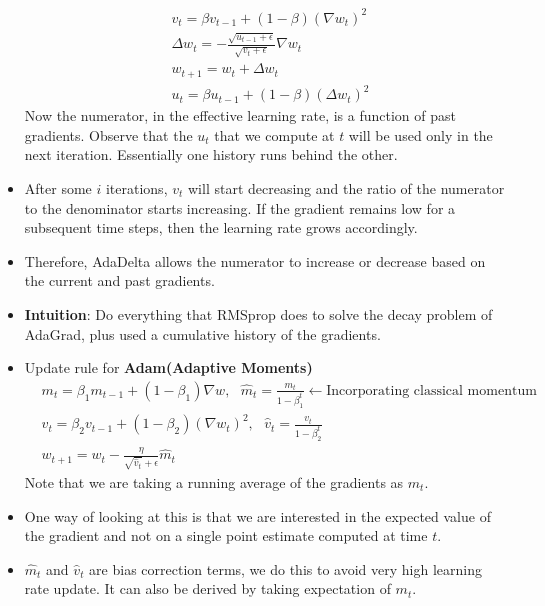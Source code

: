 \documentclass[a4paper]{article}
\begin{document}
\begin{itemize}
\begin{equation*}
        \begin{split}
            &v_t = \beta v_{t-1} + (1-\beta)(\nabla w_t)^2\\
            &\Delta w_t = -\frac{\sqrt{u_{t-1}+\epsilon}}{\sqrt{v_t+\epsilon}}\nabla w_t\\
            &w_{t+1} = w_t+\Delta w_t\\
            &u_t = \beta u_{t-1}+(1-\beta)(\Delta w_t)^2
        \end{split}
    \end{equation*}
    Now the numerator, in the effective learning rate, is a function of past gradients. Observe that the $u_t$ that we compute at $t$ will be used only in the next iteration. Essentially one history runs behind the other.
    \item After some $i$ iterations, $v_t$ will start decreasing and the ratio of the numerator to the denominator starts increasing. If the gradient remains low for a subsequent time steps, then the learning rate grows accordingly.
    \item Therefore, AdaDelta allows the numerator to increase or decrease based on the current and past gradients.
    \item \textbf{Intuition}: Do everything that RMSprop does to solve the decay problem of AdaGrad, plus used a cumulative history of the gradients.
    \item Update rule for \textbf{Adam(Adaptive Moments)}
    \begin{equation*}
        \begin{split}
            &m_t = \beta_1m_{t-1}+(1-\beta_1)\nabla w, \text{   }\hat{m}_t = \frac{m_t}{1-\beta_1^t}\gets \text{Incorporating classical momentum}\\
            &v_t = \beta_2v_{t-1}+(1-\beta_2)(\nabla w_t)^2, \text{   }\hat{v}_t = \frac{v_t}{1-\beta_2^t}\\
            &w_{t+1} = w_t - \frac{\eta}{\sqrt{\hat{v}_t}+\epsilon}\hat{m}_t
        \end{split}
    \end{equation*}
    Note that we are taking a running average of the gradients as $m_t$.
    \item One way of looking at this is that we are interested in the expected value of the gradient and not on a single point estimate computed at time $t$.
    \item $\hat{m}_t$ and $\hat{v}_t$ are bias correction terms, we do this to avoid very high learning rate update. It can also be derived by taking expectation of $m_t$.

\end{itemize}
\end{document}

